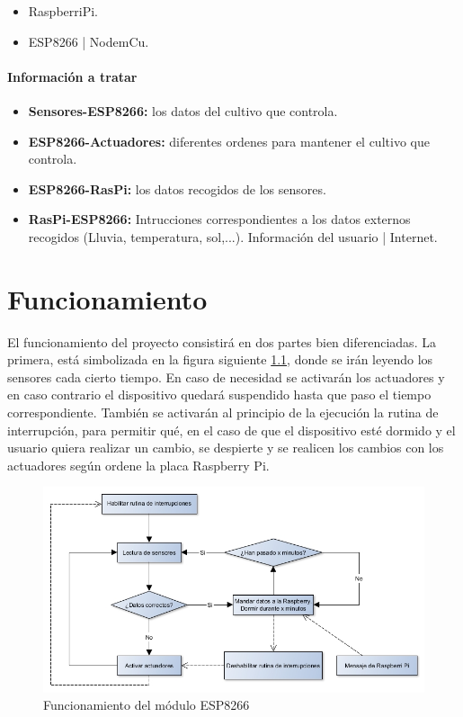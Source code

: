 \documentclass[12pt,a4paper,titlepage,oneside]{report}
\begin{document}
		\begin{itemize}
			\item RaspberriPi.
			\item ESP8266 | NodemCu.
		\end{itemize}			
	
	\subsubsection*{Información a tratar}
		
		\begin{itemize}
			\item \textbf{Sensores-ESP8266:} los datos del cultivo que controla.
			\item \textbf{ESP8266-Actuadores:} diferentes ordenes para mantener el cultivo que controla.
			\item \textbf{ESP8266-RasPi:} los datos recogidos de los sensores.
			\item \textbf{RasPi-ESP8266:} Intrucciones correspondientes a los datos externos recogidos (Lluvia, temperatura, sol,...). Información del usuario | Internet.
			
		\end{itemize}

\chapter{Funcionamiento}

	El funcionamiento del proyecto consistirá en dos partes bien diferenciadas. La primera, está simbolizada en la figura siguiente \ref{Funcionamiento}, donde se irán leyendo los sensores cada cierto tiempo. En caso de necesidad se activarán los actuadores y en caso contrario el dispositivo quedará suspendido hasta que paso el tiempo correspondiente. También se activarán al principio de la ejecución la rutina de interrupción, para permitir qué, en el caso de que el dispositivo esté dormido y el usuario quiera realizar un cambio, se despierte y se realicen los cambios con los actuadores según ordene la placa Raspberry Pi.

	\begin{figure}
		\center
		\includegraphics[scale=0.5]{./images/funcionamientoESP8266.jpg}
		\caption{Funcionamiento del módulo ESP8266}
		\label{Funcionamiento}
	\end{figure}
	
\end{document}
